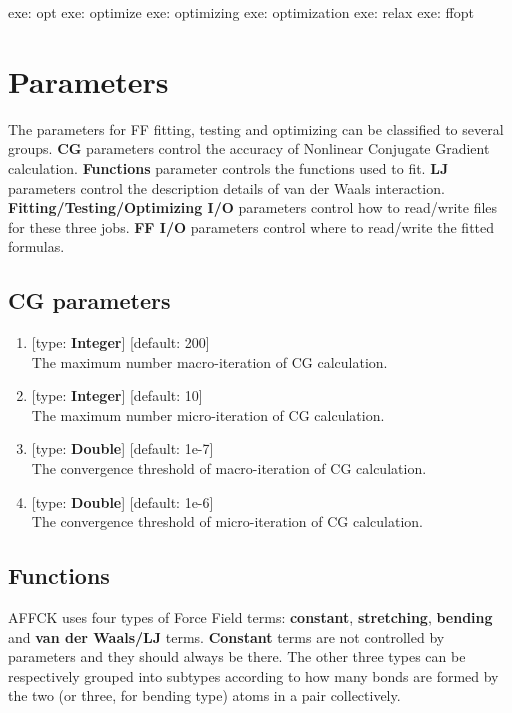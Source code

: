 \documentclass[11pt]{book}
\begin{document}
\begin{everbatim}
{ exe: opt }
{ exe: optimize }
{ exe: optimizing }
{ exe: optimization }
{ exe: relax }
{ exe: ffopt }
\end{everbatim}

\section{Parameters}

The parameters for FF fitting, testing and optimizing can be classified to several groups. \textbf{CG} parameters control the 
accuracy of Nonlinear Conjugate Gradient calculation. \textbf{Functions} parameter controls the functions used to fit. \textbf{LJ} 
parameters control the description details of van der Waals interaction. \textbf{Fitting/Testing/Optimizing I/O} parameters control 
how to read/write files for these three jobs. \textbf{FF I/O} parameters control where to read/write the fitted formulas.

\subsection{CG parameters}

\begin{enumerate}
\item {} [type: \textbf{Integer}] [default: 200] \\
	The maximum number macro-iteration of CG calculation.
\item {} [type: \textbf{Integer}] [default: 10] \\
	The maximum number micro-iteration of CG calculation.
\item {} [type: \textbf{Double}] [default: 1e-7] \\
	The convergence threshold of macro-iteration of CG calculation.
\item {} [type: \textbf{Double}] [default: 1e-6] \\
	The convergence threshold of micro-iteration of CG calculation.
\end{enumerate}

\subsection{Functions}

AFFCK uses four types of Force Field terms: \textbf{constant}, \textbf{stretching}, \textbf{bending} and \textbf{van der Waals/LJ} terms.
\textbf{Constant} terms are not controlled by parameters and they should always be there. The other three types can be respectively grouped into 
subtypes according to how many bonds are formed by the two (or three, for bending type) atoms in a pair collectively.
\end{document}

